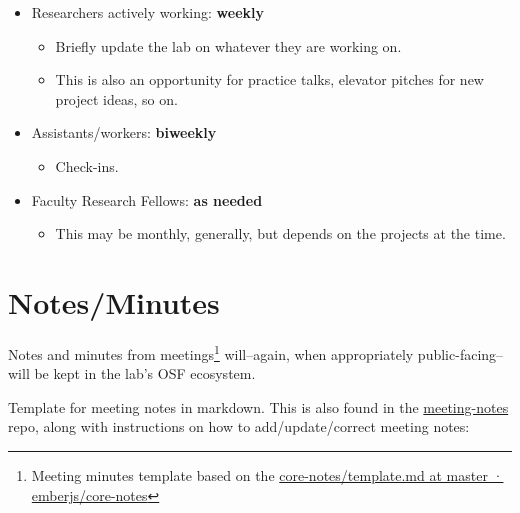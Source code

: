 \documentclass[]{tufte-book}
\providecommand{\tightlist}{%
  \setlength{\itemsep}{0pt}\setlength{\parskip}{0pt}}
\begin{document}
\begin{itemize}
\tightlist
\item
  Researchers actively working: \textbf{weekly}

  \begin{itemize}
  \tightlist
  \item
    Briefly update the lab on whatever they are working on.
  \item
    This is also an opportunity for practice talks, elevator pitches for new project ideas, so on.
  \end{itemize}
\item
  Assistants/workers: \textbf{biweekly}

  \begin{itemize}
  \tightlist
  \item
    Check-ins.
  \end{itemize}
\item
  Faculty Research Fellows: \textbf{as needed}

  \begin{itemize}
  \tightlist
  \item
    This may be monthly, generally, but depends on the projects at the time.
  \end{itemize}
\end{itemize}

\hypertarget{notesminutes}{%
\section{Notes/Minutes}\label{notesminutes}}

Notes and minutes from meetings\footnote{Meeting minutes template based on the \href{https://github.com/emberjs/core-notes/blob/master/learning-team/template.md}{core-notes/template.md at master · emberjs/core-notes}} will--again, when appropriately public-facing--will be kept in the lab's OSF ecosystem.

Template for meeting notes in markdown. This is also found in the \href{https://github.com/mavrxlab/meeting-notes}{meeting-notes} repo, along with instructions on how to add/update/correct meeting notes:
\end{document}
